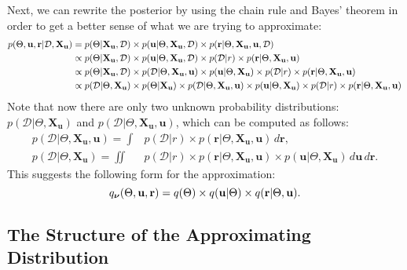 \documentclass{mprop}
\theoremstyle{definition}
\begin{document}
Next, we can rewrite the posterior by using the chain rule and Bayes' theorem in
order to get a better sense of what we are trying to approximate:
\[
  \begin{split}
    p(\Theta, \mathbf{u}, \mathbf{r} | \mathcal{D}, \mathbf{X_u}) &= p(\Theta | \mathbf{X_u}, \mathcal{D}) \times p(\mathbf{u} |
    \Theta, \mathbf{X_u}, \mathcal{D}) \times p(\mathbf{r} | \Theta,
    \mathbf{X_u}, \mathbf{u}, \mathcal{D}) \\
    &\propto p(\Theta | \mathbf{X_u}, \mathcal{D}) \times p(\mathbf{u} | \Theta,
    \mathbf{X_u}, \mathcal{D}) \times p(\mathcal{D} | r) \times p(\mathbf{r} |
    \Theta, \mathbf{X_u}, \mathbf{u}) \\
    &\propto p(\Theta | \mathbf{X_u}, \mathcal{D}) \times p(\mathcal{D} |
    \Theta, \mathbf{X_u}, \mathbf{u}) \times p(\mathbf{u} | \Theta,
    \mathbf{X_u}) \times p(\mathcal{D} | r) \times p(\mathbf{r} | \Theta,
    \mathbf{X_u}, \mathbf{u}) \\
    &\propto p(\mathcal{D} | \Theta, \mathbf{X_u}) \times p(\Theta |
    \mathbf{X_u}) \times p(\mathcal{D} | \Theta, \mathbf{X_u}, \mathbf{u})
    \times p(\mathbf{u} | \Theta, \mathbf{X_u}) \times p(\mathcal{D} | r) \times
    p(\mathbf{r} | \Theta, \mathbf{X_u}, \mathbf{u})
  \end{split}
\]
Note that now there are only two unknown probability distributions:
$p(\mathcal{D} | \Theta, \mathbf{X_u})$ and $p(\mathcal{D} | \Theta,
\mathbf{X_u}, \mathbf{u})$, which can be computed as follows:
\begin{align*}
  p(\mathcal{D} | \Theta, \mathbf{X_u}, \mathbf{u}) = \int &p(\mathcal{D} | r) \times p(\mathbf{r} | \Theta, \mathbf{X_u}, \mathbf{u}) \, d\mathbf{r}, \\
  p(\mathcal{D} | \Theta, \mathbf{X_u}) = \iint &p(\mathcal{D} | r) \times p(\mathbf{r} | \Theta, \mathbf{X_u}, \mathbf{u}) \times p(\mathbf{u} | \Theta, \mathbf{X_u}) \, d\mathbf{u} \, d\mathbf{r}.
\end{align*}
This suggests the following form for the approximation:
\[ q_{\bm\nu}(\Theta, \mathbf{u}, \mathbf{r}) = q(\Theta) \times q(\mathbf{u} | \Theta) \times q(\mathbf{r}
  | \Theta, \mathbf{u}). \]


\subsection{The Structure of the Approximating Distribution}
\end{document}
